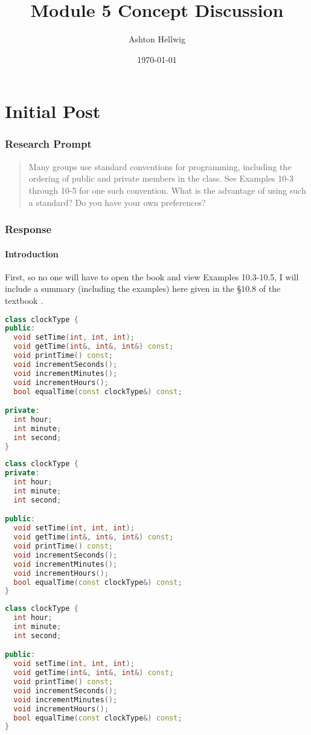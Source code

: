 \documentclass[12pt]{article}
\title{Module 5 Concept Discussion}
\author{Ashton Hellwig}
\date{\today}
\theoremstyle{definition}
\theoremstyle{plain}
\begin{document}
  \maketitle
  \tableofcontents
  \lstlistoflistings
  \newpage


  \part{Initial Post}

    \section{Research Prompt}
      \begin{quote}
        Many groups use standard conventions for programming, including the
          ordering of public and private members in the class. See Examples
          10-3 through 10-5 for one such convention. What is the advantage of
          using such a standard? Do you have your own preferences?
      \end{quote}

    \section{Response}
      \subsection{Introduction}
        First, so no one will have to open the book and view Examples 10.3-10.5,
          I will include a summary (including the examples) here given in the
          \S 10.8 of the textbook \autocite{malik_2015}.
        \begin{lstlisting}[language=c++,caption={Example 10.3},label={e3}]
class clockType {
public:
  void setTime(int, int, int);
  void getTime(int&, int&, int&) const;
  void printTime() const;
  void incrementSeconds();
  void incrementMinutes();
  void incrementHours();
  bool equalTime(const clockType&) const;

private:
  int hour;
  int minute;
  int second;
}
        \end{lstlisting}
        \begin{lstlisting}[language=c++,caption={Example 10.4},label={e4}]
class clockType {
private:
  int hour;
  int minute;
  int second;

public:
  void setTime(int, int, int);
  void getTime(int&, int&, int&) const;
  void printTime() const;
  void incrementSeconds();
  void incrementMinutes();
  void incrementHours();
  bool equalTime(const clockType&) const;
}
        \end{lstlisting}
        \begin{lstlisting}[language=c++,caption={Example 10.5},label={e5}]
class clockType {
  int hour;
  int minute;
  int second;

public:
  void setTime(int, int, int);
  void getTime(int&, int&, int&) const;
  void printTime() const;
  void incrementSeconds();
  void incrementMinutes();
  void incrementHours();
  bool equalTime(const clockType&) const;
}
        \end{lstlisting}
\end{document}
